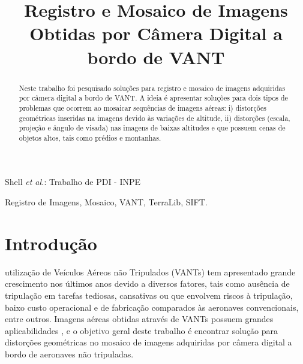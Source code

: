 \documentclass[9pt, a4paper, nofonttune, journal]{IEEEtran}
\begin{document}
\title{Registro e Mosaico de Imagens \\Obtidas por Câmera Digital a bordo de VANT}

\author{
}

%
{Shell \MakeLowercase{\textit{et al.}}: Trabalho de PDI - INPE}

\maketitle               
\renewcommand\abstractname{Resumo}
\renewcommand{\refname}{Referências}


\begin{abstract}
Neste trabalho foi pesquisado soluções para registro e mosaico de imagens adquiridas por câmera digital a bordo de VANT. A ideia é apresentar soluções para dois tipos de problemas que ocorrem ao mosaicar sequências de imagens aéreas: i) distorções geométricas inseridas na imagens devido às variações de altitude, ii) distorções (escala, projeção e ângulo de visada) nas imagens de baixas altitudes e que possuem cenas de objetos altos, tais como prédios e montanhas.
\end{abstract}

\begin{IEEEkeywords}
Registro de Imagens, Mosaico, VANT, TerraLib, SIFT.
\end{IEEEkeywords}

\section{Introdução}
 utilização de Veículos Aéreos não Tripulados (VANTs) tem apresentado grande crescimento nos últimos anos devido a diversos fatores, tais como ausência de tripulação em tarefas tediosas, cansativas ou que envolvem riscos à tripulação, baixo custo operacional e de fabricação comparados às aeronaves convencionais, entre outros. Imagens aéreas obtidas através de VANTs possuem grandes aplicabilidades \cite{canhoto}, e o objetivo geral deste trabalho é encontrar solução para distorções geométricas no mosaico de imagens adquiridas por câmera digital a bordo de aeronaves não tripuladas.
\end{document}
